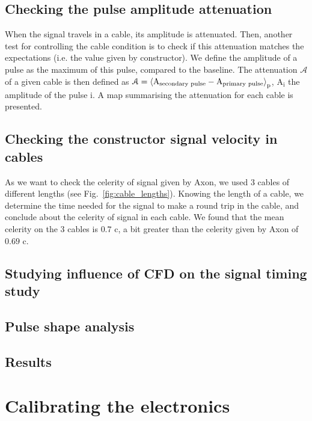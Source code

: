 \subsection{Checking the pulse amplitude attenuation}
When the signal travels in a cable, its amplitude is attenuated.
Then, another test for controlling the cable condition is to check if this attenuation matches the expectations (i.e. the value given by constructor).
We define the amplitude of a pulse as the maximum of this pulse, compared to the baseline.
The attenuation $\mathcal{A}$ of a given cable is then defined as $\mathcal{A}=\braket{\text{A}_{ \text{secondary pulse}}-\text{A}_{ \text{primary pulse}}}_{\text{p}}$, $\text{A}_{\text{i}}$ the amplitude of the pulse i.
A map summarising the attenuation for each cable is presented.

\subsection{Checking the constructor signal velocity in cables}
\label{subsec:velocity}
As we want to check the celerity of signal given by Axon, we used $3$ cables of different lengths (see Fig.~\ref{fig:cable_lengths}).
Knowing the length of a cable, we determine the time needed for the signal to make a round trip in the cable, and conclude about the celerity of signal in each cable.
We found that the mean celerity on the $3$ cables is $0.7$ c, a bit greater than the celerity given by Axon of $0.69$ c.


\subsection{Studying influence of CFD on the signal timing study}
\label{subsec:CFD}

\subsection{Pulse shape analysis}
\label{subsec:pulse_shape}


\subsection{Results}



\section{Calibrating the electronics}
\label{sec:TimeSynchroFEB}

